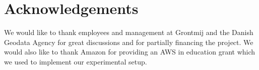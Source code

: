 \section{Acknowledgements}
We would like to thank employees and management at Grontmij and the Danish Geodata Agency for great discussions and for partially financing the project. We would also like to thank Amazon for providing an AWS in education grant which we used to implement our experimental setup.